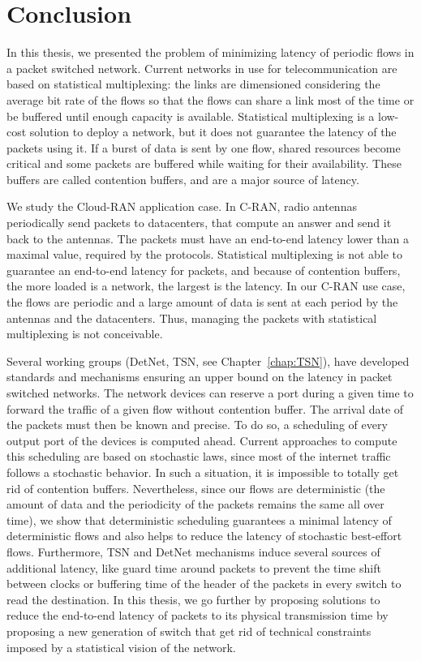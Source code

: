 
\chapter*{Conclusion}
\label{chap:concl}

In this thesis, we presented the problem of minimizing latency of periodic flows in a packet switched network. Current networks in use for telecommunication are based on statistical multiplexing: the links are dimensioned considering the average bit rate of the flows so that the flows can share a link most of the time or be buffered until enough capacity is available. Statistical multiplexing is a low-cost solution to deploy a network, but it does not guarantee the latency of the packets using it. If a burst of data is sent by one flow, shared resources become critical and some packets are buffered while waiting for their availability. These buffers are called contention buffers, and are a major source of latency.

We study the Cloud-RAN application case. In C-RAN, radio antennas periodically send packets to datacenters, that compute an answer and send it back to the antennas. The packets must have an end-to-end latency lower than a maximal value, required by the protocols. Statistical multiplexing is not able to guarantee an end-to-end latency for packets, and because of contention buffers, the more loaded is a network, the largest is the latency. In our C-RAN use case, the flows are periodic and a large amount of data is sent at each period by the antennas and the datacenters. Thus, managing the packets with statistical multiplexing is not conceivable.

Several working groups (DetNet, TSN, see Chapter~\ref{chap:TSN}), have developed standards and mechanisms ensuring an upper bound on the latency in packet switched networks. The network devices can reserve a port during a given time to forward the traffic of a given flow without contention buffer. The arrival date of the packets must then be known and precise. To do so, a scheduling of every output port of the devices is computed ahead. Current approaches to compute this scheduling are based on stochastic laws, since most of the internet traffic follows a stochastic behavior. In such a situation, it is impossible to totally get rid of contention buffers. Nevertheless, since our flows are deterministic (the amount of data and the periodicity of the packets remains the same all over time), we show that deterministic scheduling guarantees a minimal latency of deterministic flows and also helps to reduce the latency of stochastic best-effort flows. 
Furthermore, TSN and DetNet mechanisms induce several sources of additional latency, like guard time around packets to prevent the time shift between clocks or buffering time of the header of the packets in every switch to read the destination. In this thesis, we go further by proposing solutions to reduce the end-to-end latency of packets to its physical transmission time by proposing a new generation of switch that get rid of technical constraints imposed by a statistical vision of the network.


